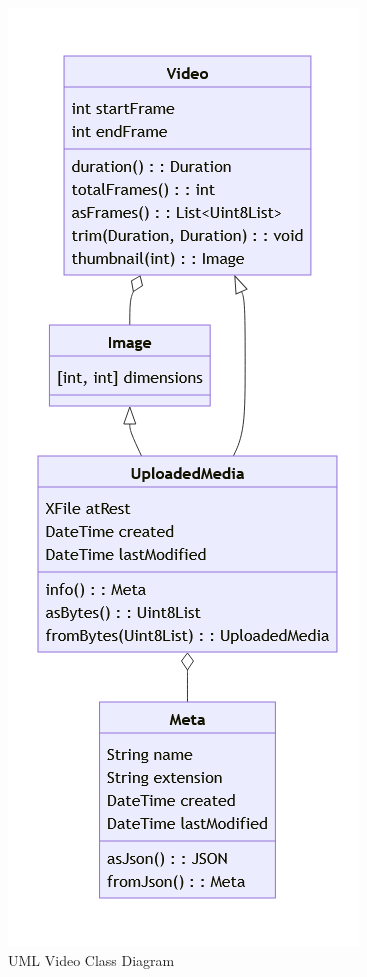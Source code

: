 \documentclass [11pt, proquest] {uwthesis}[2020/02/24]
\begin{document}
\begin{figure}
  \centering
  \includegraphics[width=\textwidth,height=0.9\textheight,keepaspectratio]{Appendix/Figures/videoClass.png}
  \caption{UML Video Class Diagram}
  \label{fig:appendix_videoClass}
\end{figure}
\end{document}
